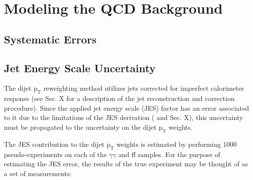 \documentclass[12pt, letterpaper]{report}
\begin{document}
\section{Modeling the QCD Background}
\subsection{Systematic Errors}

\subsection{Jet Energy Scale Uncertainty}

The dijet $\mbox{p}_{\mbox{T}}$ reweighting method utilizes jets corrected for imperfect calorimeter response (see Sec. X for a description of the jet reconstruction and correction procedure).  Since the applied jet energy scale (JES) factor has an error associated to it due to the limitations of the JES derivation (\cite{CMS_JES_paper} and Sec. X), this uncertainty must be propagated to the uncertainty on the dijet $\mbox{p}_{\mbox{T}}$ weights.

The JES contribution to the dijet $\mbox{p}_{\mbox{T}}$ weights is estimated by performing 1000 pseudo-experiments on each of the $\gamma\gamma$ and ff samples.  For the purpose of estimating the JES error, the results of the true experiment may be thought of as a set of measurements:
\end{document}
